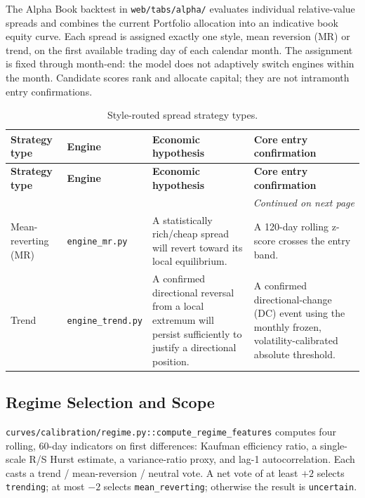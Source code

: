 The Alpha Book backtest in \texttt{web/tabs/alpha/} evaluates individual relative-value
spreads and combines the current Portfolio allocation into an indicative book
equity curve. Each spread is assigned exactly one style, mean reversion (MR) or
trend, on the first available trading day of each calendar month. The assignment
is fixed through month-end: the model does not adaptively switch engines within
the month. Candidate scores rank and allocate capital; they are not intramonth
entry confirmations.

{\small
\setlength{\LTleft}{0pt}
\setlength{\LTright}{0pt}
\setlength{\tabcolsep}{5pt}
\renewcommand{\arraystretch}{1.15}
\begin{longtable}{p{} p{} p{} p{}}
\caption{Style-routed spread strategy types.}\label{tab:pairs-strategy-types-overleaf} \\
\toprule
\textbf{Strategy type} & \textbf{Engine} & \textbf{Economic hypothesis} & \textbf{Core entry confirmation} \\
\midrule
\endfirsthead
\toprule
\textbf{Strategy type} & \textbf{Engine} & \textbf{Economic hypothesis} & \textbf{Core entry confirmation} \\
\midrule
\endhead
\midrule
\multicolumn{4}{r}{\textit{Continued on next page}} \\
\midrule
\endfoot
\bottomrule
\endlastfoot
Mean-reverting (MR) & \texttt{engine\_mr.py} & A statistically rich/cheap spread will revert toward its local equilibrium. & A 120-day rolling z-score crosses the entry band. \\
Trend & \texttt{engine\_trend.py} & A confirmed directional reversal from a local extremum will persist sufficiently to justify a directional position. & A confirmed directional-change (DC) event using the monthly frozen, volatility-calibrated absolute threshold. \\
\end{longtable}
}

\subsection{Regime Selection and Scope}
\label{sec:pairs-regime-selection}

\texttt{curves/calibration/regime.py::compute\_regime\_features} computes four rolling,
60-day indicators on first differences: Kaufman efficiency ratio, a single-scale
R/S Hurst estimate, a variance-ratio proxy, and lag-1 autocorrelation. Each casts a
trend / mean-reversion / neutral vote. A net vote of at least $+2$ selects
\texttt{trending}; at most $-2$ selects \texttt{mean\_reverting}; otherwise the result is
\texttt{uncertain}.

